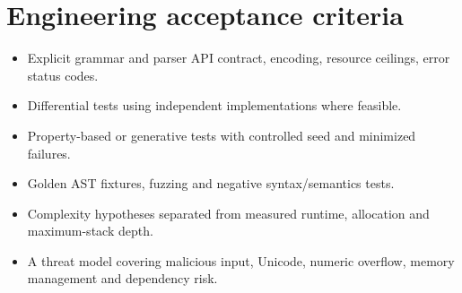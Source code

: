 \documentclass[11pt,letterpaper]{article}
\begin{document}
\section{Engineering acceptance criteria}
\begin{itemize}\item Explicit grammar and parser API contract, encoding, resource ceilings, error status codes.\item Differential tests using independent implementations where feasible.\item Property-based or generative tests with controlled seed and minimized failures.\item Golden AST fixtures, fuzzing and negative syntax/semantics tests.\item Complexity hypotheses separated from measured runtime, allocation and maximum-stack depth.\item A threat model covering malicious input, Unicode, numeric overflow, memory management and dependency risk.\end{itemize}
\end{document}
